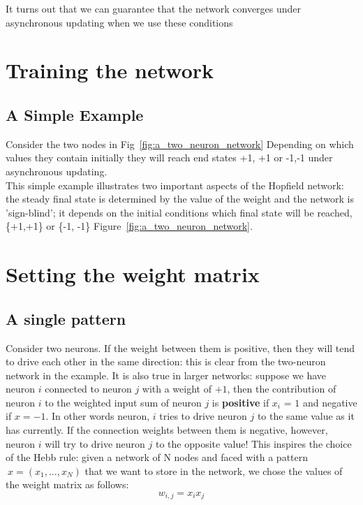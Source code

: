 It turns out that we can guarantee that the network converges under asynchronous
updating when we use these conditions

\section{Training the network}
\subsection{A Simple Example}

Consider the two nodes in Fig~\ref{fig:a_two_neuron_network} Depending on which values they contain initially they will reach end states {+1, +1} or {-1,-1} under asynchronous
updating. \\
This simple example illustrates two important aspects of the Hopfield network:
the steady final state is determined by the value of the weight and the
network is ’sign-blind’; it depends on the initial conditions which final state will
be reached, \{+1,+1\} or \{-1, -1\} Figure~\ref{fig:a_two_neuron_network}.

\section{Setting the weight matrix}
\subsection{A single pattern}
Consider two neurons. If the weight between them is positive, then they will
tend to drive each other in the same direction: this is clear from the two-neuron
network in the example. It is also true in larger networks: suppose we have
neuron $i$ connected to neuron $j$ with a weight of $+1$, then the contribution of
neuron $i$ to the weighted input sum of neuron $j$ is \textbf{positive} if $x_i$ = $1$ and negative if $x = -1$. In other words neuron, $i$ tries to drive neuron $j$ to the same value as it has currently. If the connection weights between them is negative, however,
neuron $i$ will try to drive neuron $j$ to the opposite value! This inspires the
choice of the Hebb rule: given a network of N nodes and faced with a pattern
$~x = (x_1, ..., x_N )$ that we want to store in the network, we chose the values of
the weight matrix as follows:
\[ 
 w_{i,j} = x_ix_j
\]

